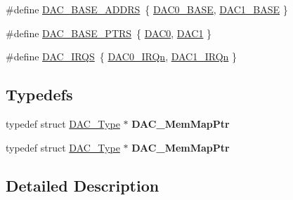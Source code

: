 \begin{DoxyCompactItemize}
\item 
\#define \hyperlink{group__DAC__Peripheral__Access__Layer_ga2e056d497cd21aa7a51e188e005e9b37}{D\+A\+C\+\_\+\+B\+A\+S\+E\+\_\+\+A\+D\+D\+RS}~\{ \hyperlink{group__DAC__Peripheral__Access__Layer_gada12ca8452e773fd8f38041872934efc}{D\+A\+C0\+\_\+\+B\+A\+SE}, \hyperlink{group__DAC__Peripheral__Access__Layer_ga3383b83a296ce0a5386a0d94195e8a99}{D\+A\+C1\+\_\+\+B\+A\+SE} \}
\item 
\#define \hyperlink{group__DAC__Peripheral__Access__Layer_gab47690040e4d63adc4f324358c27157a}{D\+A\+C\+\_\+\+B\+A\+S\+E\+\_\+\+P\+T\+RS}~\{ \hyperlink{group__DAC__Peripheral__Access__Layer_gadfe0025fe66918c644e110c3b055c955}{D\+A\+C0}, \hyperlink{group__DAC__Peripheral__Access__Layer_gaffb5ff8779fa698f3c7165a617d56e4f}{D\+A\+C1} \}
\item 
\#define \hyperlink{group__DAC__Peripheral__Access__Layer_gac003cc87c636841f96fbf9084f536c43}{D\+A\+C\+\_\+\+I\+R\+QS}~\{ \hyperlink{group__Interrupt__vector__numbers_gga666eb0caeb12ec0e281415592ae89083a6029e7bffa10f584e060a5448a456927}{D\+A\+C0\+\_\+\+I\+R\+Qn}, \hyperlink{group__Interrupt__vector__numbers_gga666eb0caeb12ec0e281415592ae89083af10966fc3931d5e75c0b53bf8eacf84e}{D\+A\+C1\+\_\+\+I\+R\+Qn} \}
\end{DoxyCompactItemize}
\subsection*{Typedefs}
\begin{DoxyCompactItemize}
\item 
typedef struct \hyperlink{structDAC__Type}{D\+A\+C\+\_\+\+Type} $\ast$ {\bfseries D\+A\+C\+\_\+\+Mem\+Map\+Ptr}\hypertarget{group__DAC__Peripheral__Access__Layer_ga152d467d7102d2350a94cd165abdcbcf}{}\label{group__DAC__Peripheral__Access__Layer_ga152d467d7102d2350a94cd165abdcbcf}

\item 
typedef struct \hyperlink{structDAC__Type}{D\+A\+C\+\_\+\+Type} $\ast$ {\bfseries D\+A\+C\+\_\+\+Mem\+Map\+Ptr}\hypertarget{group__DAC__Peripheral__Access__Layer_ga152d467d7102d2350a94cd165abdcbcf}{}\label{group__DAC__Peripheral__Access__Layer_ga152d467d7102d2350a94cd165abdcbcf}

\end{DoxyCompactItemize}


\subsection{Detailed Description}


